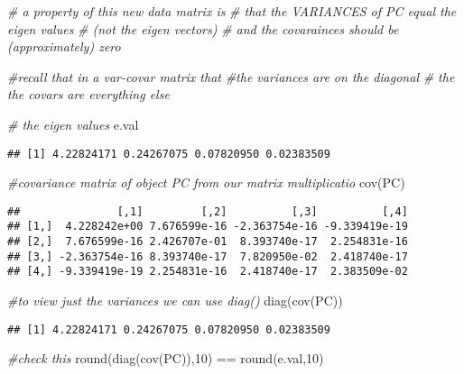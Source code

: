 \documentclass[
]{book}
\newenvironment{Shaded}{\begin{snugshade}}{\end{snugshade}}
\newcommand{\CommentTok}[1]{\textcolor[rgb]{0.56,0.35,0.01}{\textit{#1}}}
\newcommand{\DecValTok}[1]{\textcolor[rgb]{0.00,0.00,0.81}{#1}}
\newcommand{\FunctionTok}[1]{\textcolor[rgb]{0.00,0.00,0.00}{#1}}
\newcommand{\NormalTok}[1]{#1}
\newcommand{\SpecialCharTok}[1]{\textcolor[rgb]{0.00,0.00,0.00}{#1}}
\begin{document}
\begin{Shaded}
\begin{Highlighting}[]
\CommentTok{\# a property of this new data matrix is}
\CommentTok{\# that the VARIANCES of PC equal the eigen values}
\CommentTok{\# (not the eigen vectors)}
\CommentTok{\# and the covarainces should be (approximately) zero}

\CommentTok{\#recall that in a var{-}covar matrix that}
\CommentTok{\#the variances are on the diagonal}
\CommentTok{\# the the covars are everything else}

\CommentTok{\# the eigen values}
\NormalTok{e.val}
\end{Highlighting}
\end{Shaded}

\begin{verbatim}
## [1] 4.22824171 0.24267075 0.07820950 0.02383509
\end{verbatim}

\begin{Shaded}
\begin{Highlighting}[]
\CommentTok{\#covariance matrix of object PC from our matrix multiplicatio}
\FunctionTok{cov}\NormalTok{(PC)}
\end{Highlighting}
\end{Shaded}

\begin{verbatim}
##               [,1]         [,2]          [,3]          [,4]
## [1,]  4.228242e+00 7.676599e-16 -2.363754e-16 -9.339419e-19
## [2,]  7.676599e-16 2.426707e-01  8.393740e-17  2.254831e-16
## [3,] -2.363754e-16 8.393740e-17  7.820950e-02  2.418740e-17
## [4,] -9.339419e-19 2.254831e-16  2.418740e-17  2.383509e-02
\end{verbatim}

\begin{Shaded}
\begin{Highlighting}[]
\CommentTok{\#to view just the variances we can use diag()}
\FunctionTok{diag}\NormalTok{(}\FunctionTok{cov}\NormalTok{(PC))}
\end{Highlighting}
\end{Shaded}

\begin{verbatim}
## [1] 4.22824171 0.24267075 0.07820950 0.02383509
\end{verbatim}

\begin{Shaded}
\begin{Highlighting}[]
\CommentTok{\#check this}
\FunctionTok{round}\NormalTok{(}\FunctionTok{diag}\NormalTok{(}\FunctionTok{cov}\NormalTok{(PC)),}\DecValTok{10}\NormalTok{) }\SpecialCharTok{==} \FunctionTok{round}\NormalTok{(e.val,}\DecValTok{10}\NormalTok{)}
\end{Highlighting}
\end{Shaded}
\end{document}
